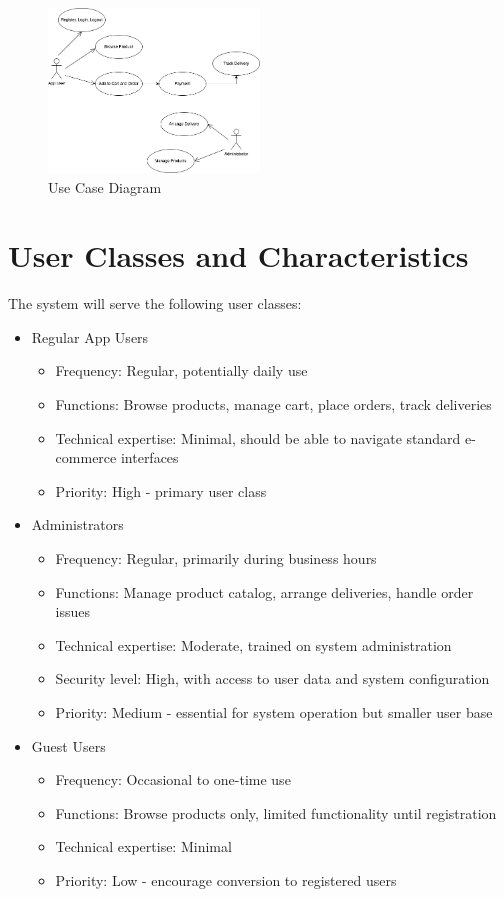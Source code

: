 \documentclass[oneside,a4paper,12pt,explicit]{book}
\begin{document}
\begin{figure}[H]
    \centering
    \includegraphics[width=0.5\textwidth]{img/users diagram.drawio (1).png}
    \caption{Use Case Diagram}
    \label{fig:usecase}
\end{figure}

\section{User Classes and Characteristics}
The system will serve the following user classes:

\begin{itemize}
    \item Regular App Users
    \begin{itemize}
        \item Frequency: Regular, potentially daily use
        \item Functions: Browse products, manage cart, place orders, track deliveries
        \item Technical expertise: Minimal, should be able to navigate standard e-commerce interfaces
        \item Priority: High - primary user class
    \end{itemize}
    
    \item Administrators
    \begin{itemize}
        \item Frequency: Regular, primarily during business hours
        \item Functions: Manage product catalog, arrange deliveries, handle order issues
        \item Technical expertise: Moderate, trained on system administration
        \item Security level: High, with access to user data and system configuration
        \item Priority: Medium - essential for system operation but smaller user base
    \end{itemize}
    
    \item Guest Users
    \begin{itemize}
        \item Frequency: Occasional to one-time use
        \item Functions: Browse products only, limited functionality until registration
        \item Technical expertise: Minimal
        \item Priority: Low - encourage conversion to registered users
    \end{itemize}
\end{itemize}
\end{document}
